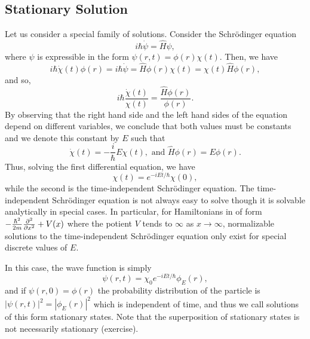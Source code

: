 \documentclass[]{article}
\theoremstyle{definition}
\theoremstyle{definition}
\begin{document}
\subsection{Stationary Solution}

Let us consider a special family of solutions. Consider the Schrödinger equation 
\[i\hbar \dot \psi = \hat H \psi,\]
where \(\psi\) is expressible in the form \(\psi(r, t) = \phi(r)\chi(t)\). Then,
we have 
\[i\hbar \dot \chi(t) \phi(r) = 
  i\hbar \dot \psi = 
  \hat H \phi(r) \chi(t) = \chi(t) \hat H \phi(r),\]
and so,
\[i\hbar \frac{\dot \chi(t)}{\chi(t)} = \frac{\hat H \phi(r)}{\phi(r)}.\]
By observing that the right hand side and the left hand sides of the equation 
depend on different variables, we conclude that both values must be constants 
and we denote this constant by \(E\) such that 
\[\dot \chi(t) = - \frac{i}{\hbar}E \chi(t), \text{ and } 
  \hat H \phi(r) = E \phi(r).\]
Thus, solving the first differential equation, we have 
\[\chi(t) = e^{-iEt / \hbar}\chi(0),\]
while the second is the time-independent Schrödinger equation.
The time-independent Schrödinger equation is not always easy to solve though 
it is solvable analytically in special cases. In particular, for Hamiltonians 
in of form \(- \frac{\hbar^2}{2m} \pdv[2]{x} + V(x)\) where the potient \(V\) 
tends to \(\infty\) as \(x \to \infty\), normalizable solutions to the 
time-independent Schrödinger equation only exist for special discrete 
values of \(E\).

In this case, the wave function is simply 
\[\psi(r, t) = \chi_0 e^{-iEt/ \hbar} \phi_E(r),\]
and if \(\psi(r, 0) = \phi(r)\) the probability distribution of the particle is
\(|\psi(r, t)|^2 = |\phi_E(r)|^2\) which is independent of time, and thus 
we call solutions of this form stationary states. Note that the superposition 
of stationary states is not necessarily stationary (exercise).
\end{document}
